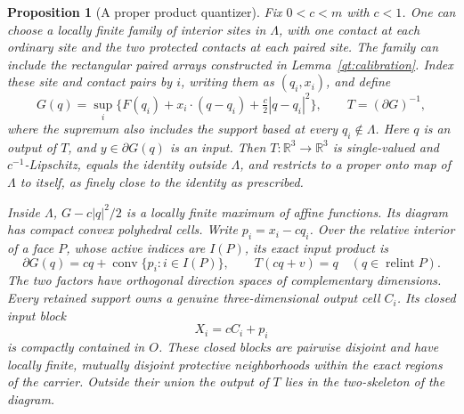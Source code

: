 \documentclass[11pt]{article}
\numberwithin{equation}{section}
\newtheorem{proposition}[theorem]{Proposition}
\theoremstyle{definition}
\theoremstyle{remark}
\begin{document}
\begin{proposition}[A proper product quantizer]\label{qt:quantizer}
Fix $0<c<m$ with $c<1$.  One can choose a locally finite family of
interior sites in $\Lambda$, with one contact at each ordinary site
and the two protected contacts at each paired site.  The family can
include the rectangular paired arrays constructed in
Lemma~\ref{qt:calibration}.  Index these site and contact pairs by
$i$, writing them as $(q_i,x_i)$, and define
\begin{equation}\label{qt:obstacle}
 G(q)=\sup_i\{F(q_i)+x_i\cdot(q-q_i)+\tfrac c2|q-q_i|^2\},
 \qquad T=(\partial G)^{-1},
\end{equation}
where the supremum also includes the support based at every
$q_i\notin\Lambda$.  Here $q$ is an output of $T$, and
$y\in\partial G(q)$ is an input.  Then $T:\mathbb R^3\to\mathbb R^3$ is single-valued and
$c^{-1}$-Lipschitz, equals the identity outside $\Lambda$, and restricts
to a proper onto map of $\Lambda$ to itself, as finely close to the
identity as prescribed.

Inside $\Lambda$, $G-c|q|^2/2$ is a locally finite maximum of affine
functions.  Its diagram has compact convex polyhedral cells.  Write
$p_i=x_i-cq_i$.  Over the relative interior of a face $P$, whose active
indices are $I(P)$, its exact input product is
\begin{equation}\label{qt:product}
 \partial G(q)=cq+\operatorname{conv}\{p_i:i\in I(P)\},\qquad
 T(cq+v)=q\quad(q\in\operatorname{relint} P).
\end{equation}
The two factors have orthogonal direction spaces of complementary
dimensions.  Every retained support owns a genuine three-dimensional
output cell $C_i$.  Its closed input block
\begin{equation}\label{qt:blocks}
 X_i=cC_i+p_i
\end{equation}
is compactly contained in $O$.  These closed blocks are pairwise
disjoint and have locally finite, mutually disjoint protective
neighborhoods within the exact regions of the carrier.  Outside their
union the output of $T$ lies in the two-skeleton of the diagram.
\end{proposition}
\end{document}
